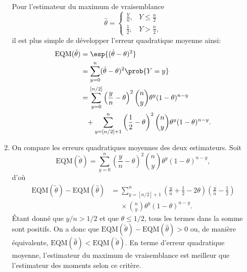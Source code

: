 \begin{exercice}
\begin{sol}
\begin{enumerate}
      Pour l'estimateur du maximum de vraisemblance
      \begin{equation*}
        \hat{\theta} =
        \begin{cases}
          \frac{Y}{n}, & Y \leq \frac{n}{2} \\
          \frac{1}{2}, & Y > \frac{n}{2},
        \end{cases}
      \end{equation*}
      il est plus simple de développer l'erreur quadratique moyenne
      ainsi:
      \begin{align*}
        \mbox{EQM}(\hat{\theta}) &= \esp{(\hat{\theta} - \theta)^2} \\
        &= \sum_{y = 0}^n (\hat{\theta} - \theta)^2 \prob{Y = y} \\
        &= \sum_{y = 0}^{[n/2]}
        \left(
          \frac{y}{n} - \theta
        \right)^2 \binom{n}{y} \theta^y (1 - \theta)^{n - y} \\
        &\phantom{=} +
        \sum_{y = [n/2] + 1}^n
        \left(
          \frac{1}{2} - \theta
        \right)^2 \binom{n}{y} \theta^y (1 - \theta)^{n - y}.
      \end{align*}
    \item On compare les erreurs quadratiques moyennes des deux
      estimateurs. Soit
      \begin{displaymath}
        \mbox{EQM}(\tilde{\theta}) = \sum_{y = 0}^n
        \left(
          \frac{y}{n} - \theta
        \right)^2 \binom{n}{y} \theta^y (1 - \theta)^{n - y},
      \end{displaymath}
      d'où
      \begin{align*}
        \mbox{EQM}(\tilde{\theta}) - \mbox{EQM}(\hat{\theta}) &=
        \sum_{y=[n/2] + 1}^n
        \left(
          \frac{y}{n} + \frac{1}{2} - 2 \theta
        \right)
        \left(
          \frac{y}{n} - \frac{1}{2}
        \right) \\
        &\phantom{=} \times
        \binom{n}{y} \theta^y (1 - \theta)^{n - y}.
      \end{align*}
      Étant donné que $y/n > 1/2$ et que $\theta \leq 1/2$, tous les
      termes dans la somme sont positifs. On a donc que
      $\mbox{EQM}(\tilde{\theta}) - \mbox{EQM}(\hat{\theta}) > 0$ ou, de manière
      équivalente, $\mbox{EQM}(\hat{\theta}) < \mbox{EQM}(\tilde{\theta})$. En terme
      d'erreur quadratique moyenne, l'estimateur du maximum de
      vraisemblance est meilleur que l'estimateur des moments selon ce critère.
    \end{enumerate}
  \end{sol}
\end{exercice}

